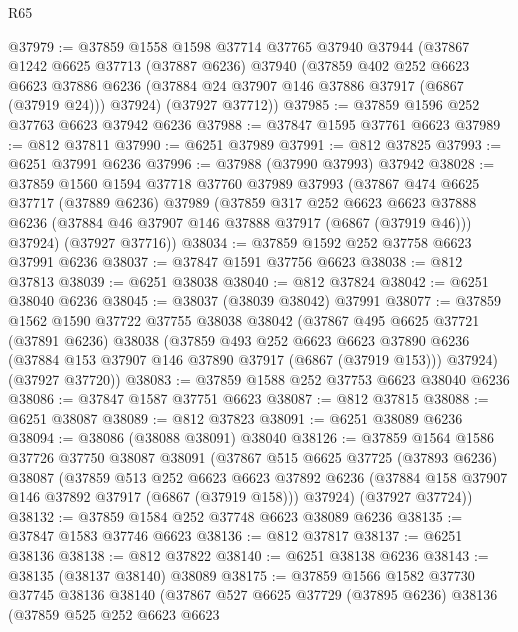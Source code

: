 \begin{lexlean}{R65}
\begin{coremodule}
{@37979 := @37859
    @1558
    @1598
    @37714
    @37765
    @37940
    @37944
    (@37867
      @1242
      @6625
      @37713
      (@37887 @6236)
      @37940
      (@37859
        @402
        @252
        @6623
        @6623
        @37886
        @6236
        (@37884 @24 @37907 @146 @37886 @37917 (@6867 (@37919 @24)))
        @37924)
      (@37927 @37712))
@37985 := @37859 @1596 @252 @37763 @6623 @37942 @6236
@37988 := @37847 @1595 @37761 @6623
@37989 := @812 @37811
@37990 := @6251 @37989
@37991 := @812 @37825
@37993 := @6251 @37991 @6236
@37996 := @37988 (@37990 @37993) @37942
@38028 := @37859
    @1560
    @1594
    @37718
    @37760
    @37989
    @37993
    (@37867
      @474
      @6625
      @37717
      (@37889 @6236)
      @37989
      (@37859
        @317
        @252
        @6623
        @6623
        @37888
        @6236
        (@37884 @46 @37907 @146 @37888 @37917 (@6867 (@37919 @46)))
        @37924)
      (@37927 @37716))
@38034 := @37859 @1592 @252 @37758 @6623 @37991 @6236
@38037 := @37847 @1591 @37756 @6623
@38038 := @812 @37813
@38039 := @6251 @38038
@38040 := @812 @37824
@38042 := @6251 @38040 @6236
@38045 := @38037 (@38039 @38042) @37991
@38077 := @37859
    @1562
    @1590
    @37722
    @37755
    @38038
    @38042
    (@37867
      @495
      @6625
      @37721
      (@37891 @6236)
      @38038
      (@37859
        @493
        @252
        @6623
        @6623
        @37890
        @6236
        (@37884 @153 @37907 @146 @37890 @37917 (@6867 (@37919 @153)))
        @37924)
      (@37927 @37720))
@38083 := @37859 @1588 @252 @37753 @6623 @38040 @6236
@38086 := @37847 @1587 @37751 @6623
@38087 := @812 @37815
@38088 := @6251 @38087
@38089 := @812 @37823
@38091 := @6251 @38089 @6236
@38094 := @38086 (@38088 @38091) @38040
@38126 := @37859
    @1564
    @1586
    @37726
    @37750
    @38087
    @38091
    (@37867
      @515
      @6625
      @37725
      (@37893 @6236)
      @38087
      (@37859
        @513
        @252
        @6623
        @6623
        @37892
        @6236
        (@37884 @158 @37907 @146 @37892 @37917 (@6867 (@37919 @158)))
        @37924)
      (@37927 @37724))
@38132 := @37859 @1584 @252 @37748 @6623 @38089 @6236
@38135 := @37847 @1583 @37746 @6623
@38136 := @812 @37817
@38137 := @6251 @38136
@38138 := @812 @37822
@38140 := @6251 @38138 @6236
@38143 := @38135 (@38137 @38140) @38089
@38175 := @37859
    @1566
    @1582
    @37730
    @37745
    @38136
    @38140
    (@37867
      @527
      @6625
      @37729
      (@37895 @6236)
      @38136
      (@37859
        @525
        @252
        @6623
        @6623
}
\end{coremodule}
\end{lexlean}
